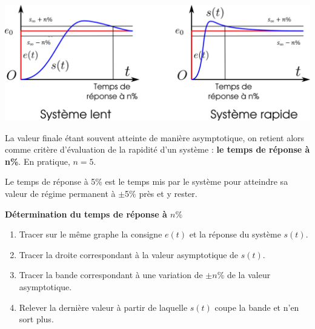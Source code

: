 \documentclass[10pt,fleqn]{article} %
\begin{document}
 \begin{center}
 \includegraphics[width=.8\textwidth]{images/rapidite}
 \end{center}

La valeur finale étant souvent atteinte de manière asymptotique, on retient
alors comme critère d'évaluation de la rapidité d'un système : \textbf{le temps
de réponse à n\%}. En pratique, $n=5$. 

Le temps de réponse à 5\% est le temps mis par le système pour atteindre sa
valeur de régime permanent à $\pm$5\% près et y rester. 


\begin{resultat}
\textbf{Détermination du temps de réponse à $n\%$}

\begin{enumerate}
 \item Tracer sur le même graphe la consigne $e(t)$ et la réponse du système
$s(t)$.
\item Tracer la droite correspondant à la valeur asymptotique de $s(t)$.
\item Tracer la bande correspondant à une variation de $\pm n\%$ de la valeur
asymptotique.
\item Relever la dernière valeur à partir de laquelle $s(t)$ coupe la bande et
n'en sort plus.
\end{enumerate}
\end{resultat}

\end{document}
